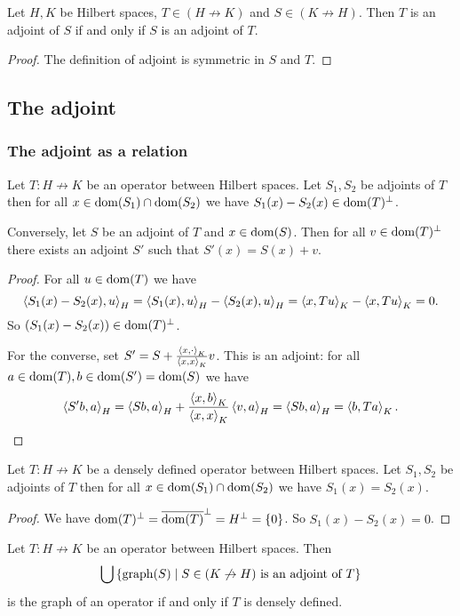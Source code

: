 \begin{lemma} \label{adjointRequirementSymmetric}
Let $H,K$ be Hilbert spaces, $T\in (H\not\to K)$ and $S\in(K\not\to H)$. Then $T$ is an adjoint of $S$ \textup{if and only if} $S$ is an adjoint of $T$.
\end{lemma}
\begin{proof}
The definition of adjoint is symmetric in $S$ and $T$.
\end{proof}

\subsection{The adjoint}
\subsubsection{The adjoint as a relation}
\begin{lemma}
Let $T: H\not\to K$ be an operator between Hilbert spaces. Let $S_1, S_2$ be adjoints of $T$ then for all $x\in \operatorname{dom}(S_1)\cap\operatorname{dom}(S_2)$ we have $S_1(x) - S_2(x) \in \operatorname{dom}(T)^\perp$.

Conversely, let $S$ be an adjoint of $T$ and $x\in\operatorname{dom}(S)$. Then for all $v\in \operatorname{dom}(T)^\perp$ there exists an adjoint $S'$ such that $S'(x) = S(x) + v$.
\end{lemma}
\begin{proof}
For all $u\in \operatorname{dom}(T)$ we have
\[ \left\langle S_1(x) - S_2(x), u \right\rangle_H = \left\langle S_1(x), u \right\rangle_H - \left\langle S_2(x), u \right\rangle_H = \left\langle x, Tu \right\rangle_K - \left\langle x, Tu \right\rangle_K = 0. \]
So $(S_1(x) - S_2(x)) \in \operatorname{dom}(T)^\perp$.

For the converse, set $S' = S + \frac{\left\langle x,\cdot \right\rangle_K}{\left\langle x,x \right\rangle_K}v$. This is an adjoint: for all $a\in \operatorname{dom}(T), b\in \operatorname{dom}(S') = \operatorname{dom}(S)$ we have
\[  \left\langle S' b,a \right\rangle_H = \left\langle Sb, a \right\rangle_H + \frac{\left\langle x,b \right\rangle_K}{\left\langle x,x \right\rangle_K}\left\langle v,a \right\rangle_H = \left\langle Sb, a \right\rangle_H = \left\langle b,Ta \right\rangle_K. \]
\end{proof}
\begin{corollary} \label{agreementAdjoints}
Let $T: H\not\to K$ be a densely defined operator between Hilbert spaces. Let $S_1, S_2$ be adjoints of $T$ then for all $x\in \operatorname{dom}(S_1)\cap\operatorname{dom}(S_2)$ we have $S_1(x) = S_2(x)$.
\end{corollary}
\begin{proof}
We have $\operatorname{dom}(T)^\perp = \overline{\operatorname{dom}(T)}^\perp = H^\perp = \{0\}$. So $S_1(x) - S_2(x) = 0$.
\end{proof}
\begin{corollary} \label{maximalAdjointIsOperator}
Let $T: H\not\to K$ be an operator between Hilbert spaces. Then
\[ \bigcup\left\{ \operatorname{graph}(S) \;\middle|\; \text{$S\in (K\not\to H)$ is an adjoint of $T$} \right\} \]
is the graph of an operator \textup{if and only if} $T$ is densely defined.
\end{corollary}

